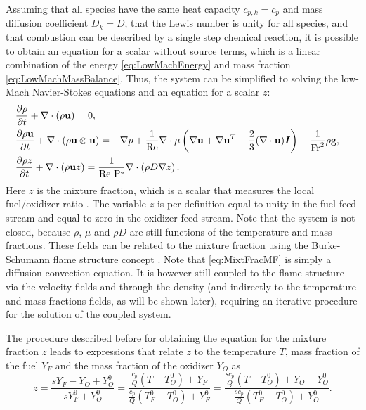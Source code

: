 Assuming that all species have the same heat capacity $c_{p,k} = c_p$ and mass diffusion coefficient $D_k=D$, that the Lewis number is unity for all species, and that combustion can be described by a single step chemical reaction, it is possible to obtain an equation for a scalar without source terms, which is a linear combination of the energy \cref{eq:LowMachEnergy} and mass fraction \cref{eq:LowMachMassBalance}. Thus, the system can be simplified to solving the low-Mach Navier-Stokes equations and an equation for a scalar $z$:
\begin{subequations}
	\begin{flalign}
		&\frac{\partial \rho}{\partial t}+	\nabla \cdot (\rho \textbf{u})                           = 0,& \label{eq:MixtFracConti2}                                                                                                                                                                    \\	
		&\frac{\partial \rho \textbf{u}}{\partial t} +	\nabla \cdot (\rho \textbf{u} \otimes \textbf{u})  = - \nabla p + \frac{1}{\text{Re}}\nabla \cdot \mu\left( \nabla \textbf{u} +\nabla \textbf{u}^T  - \frac{2}{3}(\nabla\cdot \textbf{u})\boldsymbol I \right)  - \frac{1}{\text{Fr}^2}\rho\textbf{g},&\label{eq:MixtFracMom} \\
		&\frac{\partial \rho z}{\partial t}+	\nabla \cdot (\rho \textbf{u}z)                        = \frac{1}{\text{Re Pr}}\nabla \cdot\left(\rho D \nabla z\right).& \label{eq:MixtFracMF}
	\end{flalign}
	\label{eq:all-eq-mixfrac}
\end{subequations}
Here $z$ is the mixture fraction, which is a scalar that measures the local fuel/oxidizer ratio  \parencite{poinsotTheoreticalNumericalCombustion2005}. The variable $z$ is per definition equal to unity in the fuel feed stream and equal to zero in the oxidizer feed stream. Note that the system is not closed, because $\rho$, $\mu$ and $\rho D$ are still functions of the temperature and mass fractions. These fields can be related to the mixture fraction using the Burke-Schumann flame structure concept \parencite{burkeDiffusionFlames1928}. 
Note that \cref{eq:MixtFracMF} is simply a diffusion-convection equation. It is however still coupled to the flame structure via the velocity fields and through the density (and indirectly to the temperature and mass fractions fields, as will be shown later), requiring an iterative procedure for the solution of the coupled system. 

The procedure described before for obtaining the equation for the mixture fraction $z$ leads to expressions that relate $z$ to the temperature $T$, mass fraction of the fuel $Y_F$ and the mass fraction of the oxidizer $Y_O$ as
\begin{equation}
	z = \frac{s Y_F -Y_O +Y_O^0}{sY_F^0+Y_O^0} = \frac{\frac{c_p}{Q}(T-T_O^0)+Y_F }{\frac{c_p}{Q}(T_F^0-T_O^0)+Y_F^0} = \frac{\frac{s c_p}{Q}(T-T_O^0)+Y_O-Y_O^0 }{\frac{sc_p}{Q}(T_F^0-T_O^0)+Y_O^0}. \label{eq:AllMFRelationships}
\end{equation}


